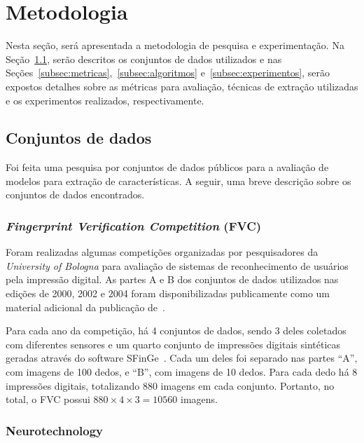 \section{Metodologia}\label{sec:metodologia}

Nesta seção, será apresentada a metodologia de pesquisa e experimentação. Na Seção~\ref{subsec:dataset}, serão descritos os conjuntos de dados utilizados e nas Seções~\ref{subsec:metricas},~\ref{subsec:algoritmos} e~\ref{subsec:experimentos}, serão expostos detalhes sobre as métricas para avaliação, técnicas de extração utilizadas e os experimentos realizados, respectivamente.


\subsection{Conjuntos de dados}\label{subsec:dataset}

Foi feita uma pesquisa por conjuntos de dados públicos para a avaliação de modelos para extração de características. A seguir, uma breve descrição sobre os conjuntos de dados encontrados.


\subsubsection{\textit{Fingerprint Verification Competition} (FVC)}\label{subsubsec:fvc}

Foram realizadas algumas competições organizadas por pesquisadores da \textit{University of Bologna} para avaliação de sistemas de reconhecimento de usuários pela impressão digital. As partes A e B dos conjuntos de dados utilizados nas edições de 2000, 2002 e 2004 foram disponibilizadas publicamente como um material adicional da publicação de~.

Para cada ano da competição, há 4 conjuntos de dados, sendo 3 deles coletados com diferentes sensores e um quarto conjunto de impressões digitais sintéticas geradas através do software SFinGe~\cite{handbook_of_fp_recognition}. Cada um deles foi separado nas partes ``A'', com imagens de 100 dedos, e ``B'', com imagens de 10 dedos. Para cada dedo há 8 impressões digitais, totalizando 880 imagens em cada conjunto. Portanto, no total, o FVC possui $880 \times 4 \times 3 = 10560$ imagens.


\subsubsection{Neurotechnology}\label{subsubsec:neurotechnology}


